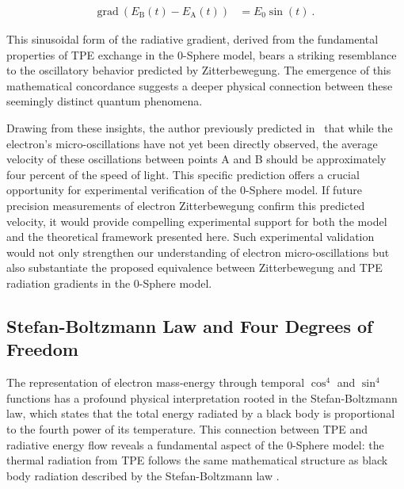 \documentclass[%
 reprint,
 amsmath,amssymb,
 aps,
]{revtex4-1}
\numberwithin{equation}{section}%
\begin{document}
        \begin{align}
            \mathrm{grad} \ (E_{\mathrm{B}}(t) - E_{\mathrm{A}}(t))
                &= E_{0} \sin(t)
                \ .
            \label{e3_simple_harmonic_motion}
        \end{align}

This sinusoidal form of the radiative gradient, derived from the fundamental properties of TPE exchange in the 0-Sphere model, bears a striking resemblance to the oscillatory behavior predicted by Zitterbewegung. The emergence of this mathematical concordance suggests a deeper physical connection between these seemingly distinct quantum phenomena.

Drawing from these insights, the author previously predicted in~\cite{hanamura2023} that while the electron's micro-oscillations have not yet been directly observed, the average velocity of these oscillations between points A and B should be approximately four percent of the speed of light. This specific prediction offers a crucial opportunity for experimental verification of the 0-Sphere model. If future precision measurements of electron Zitterbewegung confirm this predicted velocity, it would provide compelling experimental support for both the model and the theoretical framework presented here. Such experimental validation would not only strengthen our understanding of electron micro-oscillations but also substantiate the proposed equivalence between Zitterbewegung and TPE radiation gradients in the 0-Sphere model.


\subsection{\label{sec:Stefan-Boltzmann Law and}Stefan-Boltzmann Law and Four Degrees of Freedom}

The representation of electron mass-energy through temporal $\cos^4$ and $\sin^4$ functions has a profound physical interpretation rooted in the Stefan-Boltzmann law, which states that the total energy radiated by a black body is proportional to the fourth power of its temperature. This connection between TPE and radiative energy flow reveals a fundamental aspect of the 0-Sphere model: the thermal radiation from TPE follows the same mathematical structure as black body radiation described by the Stefan-Boltzmann law \cite{landau_statistical, feynman1972}.
\end{document}
